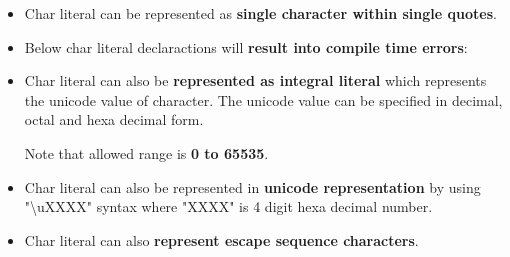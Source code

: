 
\begin{flushleft}
	\begin{itemize}		
		\item Char literal can be represented as \textbf{single character within single quotes}.

		\item Below char literal declaractions will \textbf{result into compile time errors}:
		

		\item Char literal can also be \textbf{represented as integral literal} which represents the unicode value of character.
		\newline
		The unicode value can be specified in decimal, octal and hexa decimal form.

		Note that allowed range is \textbf{0 to 65535}.
		
		\bigskip
		\item Char literal can also be represented in \textbf{unicode representation} by using "\textbackslash uXXXX" syntax where "XXXX" is 4 digit hexa decimal number.
		
		
		\newpage
		
		\item Char literal can also \textbf{represent escape sequence characters}.

	\end{itemize}
	

\end{flushleft}



